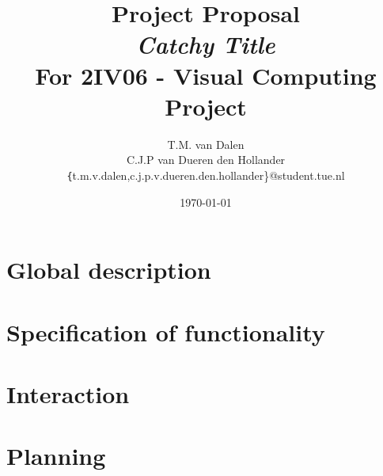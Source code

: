 \documentclass[11pt,a4paper,twocolumn]{article}
\title{
	{\huge Project Proposal\\ \emph{Catchy Title}}\\
	{\large For 2IV06 - Visual Computing Project}
}
\author{
	T.M. van Dalen \\
	C.J.P van Dueren den Hollander\\
	{\texttt\{t.m.v.dalen,c.j.p.v.dueren.den.hollander\}}@student.tue.nl
}
\date{\today}
\begin{document}
	\maketitle
	
	
	
	\section{Global description}
	\label{sec:desc}
	

	\section{Specification of functionality}
	\label{sec:func}
	

	\section{Interaction}
	\label{sec:interaction}
	

	\section{Planning}
	\label{sec:planning}
	

	
	
\end{document}
